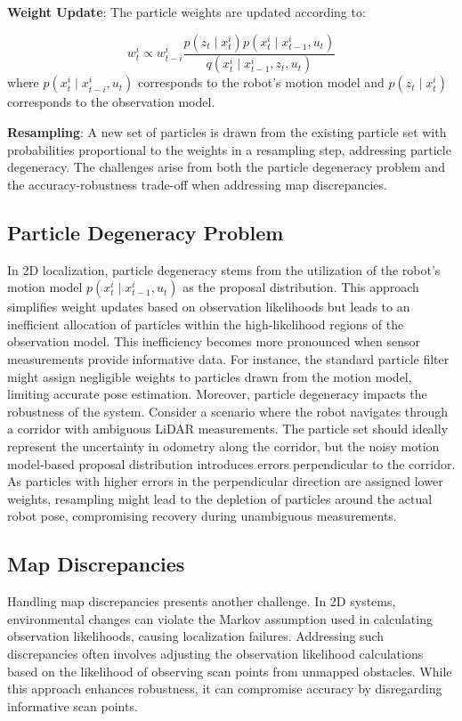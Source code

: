 \documentclass[rnd]{mas_proposal}
\begin{document}
\textbf{Weight Update}: The particle weights are updated according to:

\begin{equation}
    w_t^i \propto w_{t-i}^{i}\frac{p(z_t \mid x^i_t)p(x^i_t \mid x^i_{t-1},u_t)}{q(x^i_t \mid x^i_{t-1},z_t,u_t)}
\end{equation}
where $p(x^i_t \mid x^i_{t-i},u_t)$ corresponds to the robot’s motion model and $p(z_t \mid x^i_t)$ corresponds to the observation model.

\textbf{Resampling}: A new set of particles is drawn from the existing particle set with probabilities proportional to the weights in a resampling step, addressing particle degeneracy.
The challenges arise from both the particle degeneracy problem and the accuracy-robustness trade-off when addressing map discrepancies.

\subsection{Particle Degeneracy Problem}
In 2D localization, particle degeneracy stems from the utilization of the robot's motion model $p(x^i_t \mid x^i_{t-1},u_t)$ as the proposal distribution. This approach simplifies weight updates based on observation likelihoods but leads to an inefficient allocation of particles within the high-likelihood regions of the observation model. This inefficiency becomes more pronounced when sensor measurements provide informative data. For instance, the standard particle filter might assign negligible weights to particles drawn from the motion model, limiting accurate pose estimation.
Moreover, particle degeneracy impacts the robustness of the system. Consider a scenario where the robot navigates through a corridor with ambiguous LiDAR measurements. The particle set should ideally represent the uncertainty in odometry along the corridor, but the noisy motion model-based proposal distribution introduces errors perpendicular to the corridor. As particles with higher errors in the perpendicular direction are assigned lower weights, resampling might lead to the depletion of particles around the actual robot pose, compromising recovery during unambiguous measurements.

\subsection{Map Discrepancies}
Handling map discrepancies presents another challenge. In 2D systems, environmental changes can violate the Markov assumption used in calculating observation likelihoods, causing localization failures. Addressing such discrepancies often involves adjusting the observation likelihood calculations based on the likelihood of observing scan points from unmapped obstacles. While this approach enhances robustness, it can compromise accuracy by disregarding informative scan points.
\end{document}
